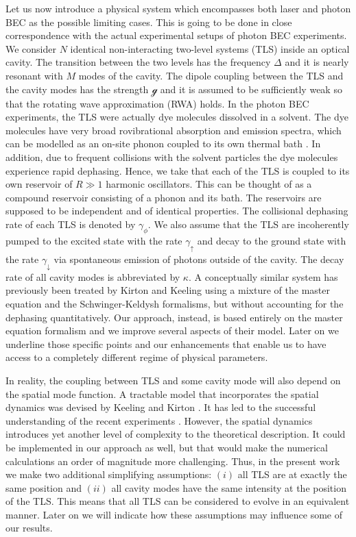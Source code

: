 \documentclass[12pt, a4paper]{iopart}
\begin{document}
Let us now introduce a physical system which encompasses both laser and photon BEC as the possible limiting cases. This is going to be done in close correspondence with the actual experimental setups of photon BEC experiments. We consider $N$ identical non-interacting two-level systems (TLS) inside an optical cavity. The transition between the two levels has the frequency $\Delta$ and it is nearly resonant with $M$ modes of the cavity. The dipole coupling between the TLS and the cavity modes has the strength $\mathcal{g}$ and it is assumed to be sufficiently weak so that the rotating wave approximation (RWA) holds. In the photon BEC experiments, the TLS were actually dye molecules dissolved in a solvent. The dye molecules have very broad rovibrational absorption and emission spectra, which can be modelled as an on-site phonon coupled to its own thermal bath \cite{Keeling_PRL-nonequilibrium_model_photon-cond,Keeling-Thermalization_photon_condensate}. {In addition, due to frequent collisions with the solvent particles the dye molecules experience rapid dephasing.} Hence, we take that each of the TLS is coupled to its own reservoir of $R\gg 1$ harmonic oscillators. This can be thought of as a compound reservoir consisting of a phonon and its bath. The reservoirs are supposed to be independent and of identical properties. {The collisional dephasing rate of each TLS is denoted by $\gamma_\phi$.} We also assume that the TLS are incoherently pumped to the excited state with the rate $\gamma_\uparrow$ and decay to the ground state with the rate $\gamma_\downarrow$ via spontaneous emission of photons outside of the cavity. The decay rate of all cavity modes is abbreviated by $\kappa$. A conceptually similar system has previously been treated by Kirton and Keeling \cite{Keeling_PRL-nonequilibrium_model_photon-cond,Keeling-Thermalization_photon_condensate} using a mixture of the master equation and the Schwinger-Keldysh formalisms{, but without accounting for the dephasing quantitatively}. Our approach, instead, is based entirely on the master equation formalism and we improve several aspects of their model. Later on we underline those specific points and our enhancements {that enable us to have access to a completely different regime of physical parameters.}

{In reality, the coupling between TLS and some cavity mode will also depend on the spatial mode function. A tractable model that incorporates the spatial dynamics was devised by Keeling and Kirton \cite{Keeling-Spatial_dynamics}. It has led to the successful understanding of the recent experiments \cite{Marelic_Photon_BEC_London,PhotonBEC-Thermalization_kinetics-Weitz}. However, the spatial dynamics introduces yet another level of complexity to the theoretical description. It could be implemented in our approach as well, but that would make the numerical calculations an order of magnitude more challenging. Thus, in the present work we make two additional simplifying assumptions: $(i)$ all TLS are at exactly the same position and $(ii)$ all cavity modes have the same intensity at the position of the TLS. This means that all TLS can be considered to evolve in an equivalent manner. Later on we will indicate how these assumptions may influence some of our results.}
\end{document}
